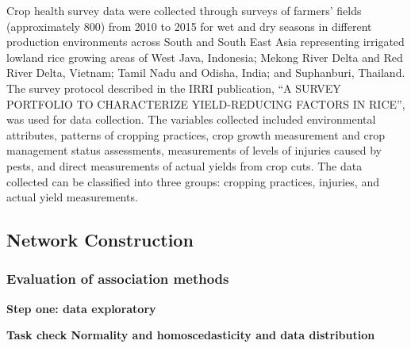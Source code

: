 \documentclass[a4paper]{article}
\begin{document}
Crop health survey data were collected through surveys of farmers' fields (approximately 800) from 2010 to 2015 for wet and dry seasons in different production environments across South and South East Asia representing irrigated lowland rice growing areas of West Java, Indonesia; Mekong River Delta and Red River Delta, Vietnam; Tamil Nadu and Odisha, India; and Suphanburi, Thailand. The survey protocol described in the IRRI publication, ``A SURVEY PORTFOLIO TO CHARACTERIZE YIELD-REDUCING FACTORS IN RICE'', \citep{Savarysurvey2009} was used for data collection. The variables collected included environmental attributes, patterns of cropping practices, crop growth measurement and crop management status assessments, measurements of levels of injuries caused by pests, and direct measurements of actual yields from crop cuts. The data collected can be classified into three groups: cropping practices, injuries, and actual yield measurements.

\subsection{Network Construction}

\subsubsection{Evaluation of association methods}

\textbf{Step one: data exploratory}


\textbf{Task check Normality and homoscedasticity and data distribution}
\end{document}
